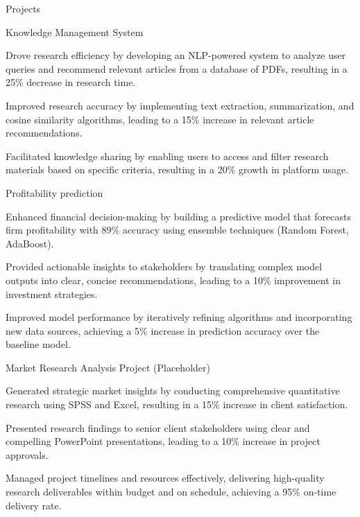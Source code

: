 \documentclass{resume} %
\begin{document}
    \begin{rSection}{Projects}
                    \begin{rSubsection}
                                    {Knowledge Management System}
                                {}{}{}
                                    \item Drove research efficiency by developing an NLP{-}powered system to analyze user queries and recommend relevant articles from a database of PDFs, resulting in a 25\% decrease in research time.
                                    \item Improved research accuracy by implementing text extraction, summarization, and cosine similarity algorithms, leading to a 15\% increase in relevant article recommendations.
                                    \item Facilitated knowledge sharing by enabling users to access and filter research materials based on specific criteria, resulting in a 20\% growth in platform usage.
                            \end{rSubsection}
                    \begin{rSubsection}
                                    {Profitability prediction}
                                {}{}{}
                                    \item Enhanced financial decision{-}making by building a predictive model that forecasts firm profitability with 89\% accuracy using ensemble techniques (Random Forest, AdaBoost).
                                    \item Provided actionable insights to stakeholders by translating complex model outputs into clear, concise recommendations, leading to a 10\% improvement in investment strategies.
                                    \item Improved model performance by iteratively refining algorithms and incorporating new data sources, achieving a 5\% increase in prediction accuracy over the baseline model.
                            \end{rSubsection}
                    \begin{rSubsection}
                                    {Market Research Analysis Project (Placeholder)}
                                {}{}{}
                                    \item Generated strategic market insights by conducting comprehensive quantitative research using SPSS and Excel, resulting in a 15\% increase in client satisfaction.
                                    \item Presented research findings to senior client stakeholders using clear and compelling PowerPoint presentations, leading to a 10\% increase in project approvals.
                                    \item Managed project timelines and resources effectively, delivering high{-}quality research deliverables within budget and on schedule, achieving a 95\% on{-}time delivery rate.
                            \end{rSubsection}
            \end{rSection}
\end{document}
